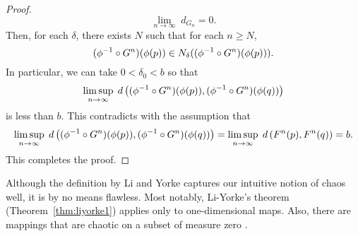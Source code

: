 \documentclass[10pt,draft,twoside]{book}
\begin{document}
\begin{theorem}
\begin{proof}
  \begin{equation*}
    \lim\limits_{n \to \infty}\; d_{G_n} = 0.
  \end{equation*}
  Then, for each $\delta$, there exists $N$ such that for each $n \geq N$,
  \begin{equation*}
    (\phi^{-1} \circ G^n)(\phi(p)) \in N_{\delta}((\phi^{-1} \circ G^n)(\phi(p))).
  \end{equation*}
  In particular, we can take $0 < \delta_0 < b$ so that
  \begin{equation*}
    \limsup\limits_{n \to \infty}\; d\left( (\phi^{-1}\circ G^{n})(\phi(p)) , (\phi^{-1}\circ G^{n})(\phi(q)) \right)
  \end{equation*}
  is less than $b$.
  This contradicts with the assumption that
  \begin{equation*}
    \limsup\limits_{n \to \infty}\; d\left( (\phi^{-1}\circ G^{n})(\phi(p)) , (\phi^{-1}\circ G^{n})(\phi(q)) \right)
    = \limsup\limits_{n \to \infty}\; d\left( F^{n}(p) , F^{n}(q) \right) 
    = b.
    \end{equation*}
  This completes the proof.
  \end{proof}
  \label{thm:liyorke-conj}
\end{theorem}
Although the definition by Li and Yorke captures our intuitive notion of chaos well, it is by no means flawless.
Most notably, Li-Yorke's theorem (Theorem~\ref{thm:liyorke1}) applies only to one-dimensional maps.
Also, there are mappings that are chaotic on a subset of measure zero \citep{martelli}.
\end{document}
